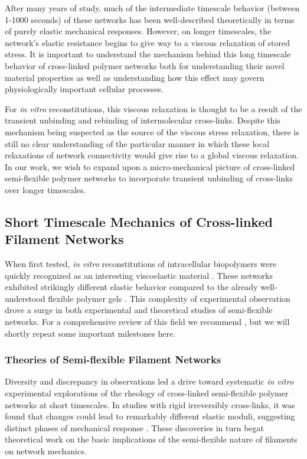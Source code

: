 \documentclass[pre,reprint]{revtex4-1}
\begin{document}
After many years of study, much of the intermediate timescale behavior (between 1-1000 seconds) of these networks has been well-described theoretically in terms of purely elastic mechanical responses.  However, on longer timescales, the network's elastic resistance begins to give way to a viscous relaxation of stored stress.   It is important to understand the mechanism behind this long timescale behavior of cross-linked polymer networks both for understanding their novel material properties as well as understanding how this effect may govern physiologically important cellular processes\cite{cell_rheo}.

For {\em in vitro} reconstitutions, this viscous relaxation is thought to be a result of the transient unbinding and rebinding of intermolecular cross-links\cite{rheo_crosslinksmatter,theo_crosslinkslip1}. Despite this mechanism being suspected as the source of the viscous stress relaxation, there is still no clear understanding of the particular manner in which these local relaxations of network connectivity would give rise to a global viscous relaxation.  In our work, we wish to expand upon a micro-mechanical picture of cross-linked semi-flexible polymer networks to incorporate transient unbinding of cross-links over longer timescales.  


\subsection{Short Timescale Mechanics of Cross-linked Filament Networks}

When first tested, {\em in vitro} reconstitutions of intracellular biopolymers were quickly recognized as an interesting viscoelastic material \cite{rheo_actingel}.  These networks exhibited strikingly different elastic behavior compared to the already well-understood flexible polymer gels \cite{rheo_bench}.  This complexity of experimental observation drove a surge in both experimental and theoretical studies of semi-flexible networks.  For a comprehensive review of this field we recommend \cite{megareview}, but we will shortly repeat some important milestones here.

\subsubsection{Theories of Semi-flexible Filament Networks}
 
Diversity and discrepancy in observations led a drive toward systematic {\em in vitro} experimental explorations of the rheology of cross-linked semi-flexible polymer networks at short timescales.  In studies with rigid irreversibly cross-links, it was found that changes could lead to remarkably different elastic moduli, suggesting distinct phases of mechanical response \cite{rheo_marge}.  These discoveries in turn begat theoretical work on the basic implications of the semi-flexible nature of filaments on network mechanics.  
\end{document}
